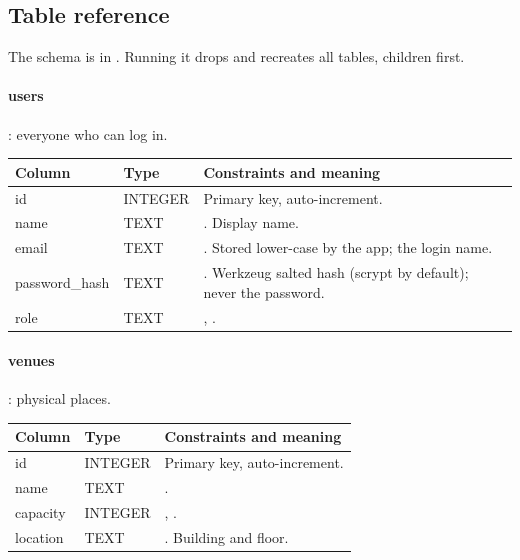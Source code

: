 \documentclass[11pt,a4paper]{article}
\begin{document}
\subsection{Table reference}

The schema is in . Running it drops and recreates all tables, children first.

\newcommand{\coltable}[1]{%
\begin{tabularx}{\linewidth}{@{}>{\ttfamily}l >{\ttfamily}l X@{}}
\toprule
\textbf{\textrm{Column}} & \textbf{\textrm{Type}} & \textbf{Constraints and meaning} \\
\midrule
#1
\bottomrule
\end{tabularx}}

\paragraph{users}: everyone who can log in.\par\smallskip
\noindent\small\coltable{
id & INTEGER & Primary key, auto-increment. \\
name & TEXT & \code{NOT NULL}. Display name. \\
email & TEXT & \code{NOT NULL UNIQUE}. Stored lower-case by the app; the login name. \\
password\_hash & TEXT & \code{NOT NULL}. Werkzeug salted hash (scrypt by default); never the password. \\
role & TEXT & \code{NOT NULL DEFAULT 'student'}, \code{CHECK (role IN ('admin','student'))}. \\
}\normalsize

\paragraph{venues}: physical places.\par\smallskip
\noindent\small\coltable{
id & INTEGER & Primary key, auto-increment. \\
name & TEXT & \code{NOT NULL}. \\
capacity & INTEGER & \code{NOT NULL}, \code{CHECK (capacity > 0)}. \\
location & TEXT & \code{NOT NULL}. Building and floor. \\
}\normalsize
\end{document}
